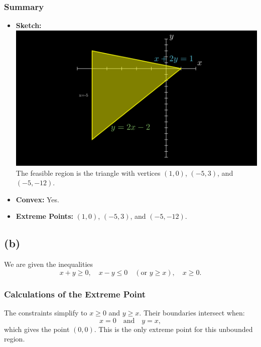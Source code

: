 \documentclass{article}
\begin{document}
\subsubsection*{Summary}
\begin{itemize}
    \item \textbf{Sketch:}\\[0.5em]
    \includegraphics[width=0.8\linewidth]{SystemAScene.png}\\[0.5em]
    The feasible region is the triangle with vertices \((1,0)\), \((-5,3)\), and \((-5,-12)\).
    \item \textbf{Convex:} Yes.
    \item \textbf{Extreme Points:} \((1,0)\), \((-5,3)\), and \((-5,-12)\).
\end{itemize}

\subsection*{(b)}
We are given the inequalities
\[
x+y \ge 0,\quad x-y \le 0 \quad (\text{or } y\ge x),\quad x\ge 0.
\]

\subsubsection*{Calculations of the Extreme Point}
The constraints simplify to \(x\ge0\) and \(y\ge x\). Their boundaries intersect when:
\[
x=0 \quad \text{and} \quad y=x,
\]
which gives the point \((0,0)\). This is the only extreme point for this unbounded region.
\end{document}

